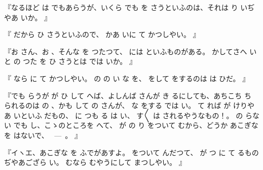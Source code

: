 『なるほど
は
でもあらうが、いくら
でも
を
さうといふのは、それは
り
いぢやあ
いか。
』

『
だから
ひ
さうといふので、
かあ
いに
て
かつしやい。
』

『お
さん、お
、そんな
を
つたつて、
には
といふものがある。
かしてさへ
いと
の
つた
を
ひ
さうとは
では
いか。
』

『
なら
に
て
かつしやい。
の
の
い
な
を、
をして
をするのは
は
ひだ。
』

『でも
らうが
が
ひ
して
へば、よしんば
さんが
き
るにしても、あちこち
ち
られるのは
の
、かも
して
の
さんが、
な
をする
では
い。
て
れば
が
けりやあ
いといふ
だもの、
に
つも
る
は
い、
す〳〵
は
されるやうなもの！。
の
らない
でも
し、こゝのところを
へて、
が
の
り
をついて
むから、どうか
あこぎな
を
はないで、
\ ---\ 。
』

『イヽエ、あこぎな
を
ふでがあすよ。
をついて
んだつて、
が
つ
に
て
るものぢやあござら
い。
むなら
むやうにして
まつしやい。
』

